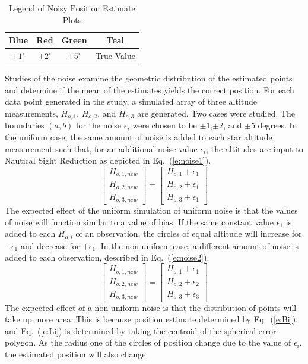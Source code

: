 \documentclass[12pt,a4paper]{book}
\begin{document}
\begin{table}[ht!]
\centering
\begin{tabular}{ |c|c|c|c| } 
 \hline
 Blue & Red & Green & Teal\\ 
 \hline
 $\pm 1^{\circ}$ & $\pm 2^{\circ}$& $\pm 5^{\circ}$ & True Value \\ 
 \hline
\end{tabular}
\caption{Legend of Noisy Position Estimate Plots}
\label{t:colorz2}
\end{table}
Studies of the noise examine the geometric distribution of the estimated points and determine if the mean of the estimates yields the correct position.  For each data point generated in the study, a simulated array of three altitude measurements, $H_{o,1}$, $H_{o,2}$, and $H_{o,3}$ are generated.  
Two cases were studied.  The boundaries $(a,b)$ for the noise $\epsilon_{i}$ were chosen to be $\pm 1$,$\pm 2$, and $\pm5 $ degrees. In the uniform case, the same amount of noise is added to each star altitude measurement such that, for an additional noise value $\epsilon_{i}$, the altitudes are input to Nautical Sight Reduction as depicted in Eq.~(\ref{e:noise1}).
\begin{equation}
\begin{bmatrix}
H_{o,1,new} \\
H_{o,2,new}\\
H_{o,3,new}
\end{bmatrix} = 
\begin{bmatrix}
H_{o,1} + \epsilon_{1}\\
H_{o,2} + \epsilon_{1}\\
H_{o,3} + \epsilon_{1}
\end{bmatrix}
\label{e:noise1}
\end{equation}
The expected effect of the uniform simulation of uniform noise is that the values of noise will function similar to a value of bias.  If the same constant value $\epsilon_{1}$ is added to each $H_{o,i}$ of an observation, the circles of equal altitude will increase for $-\epsilon_{1}$ and decrease for $+\epsilon_{1}$.
In the non-uniform case, a different amount of noise is added to each observation, described in Eq.~(\ref{e:noise2}).
\begin{equation}
\begin{bmatrix}
H_{o,1,new} \\
H_{o,2,new}\\
H_{o,3,new}
\end{bmatrix} = 
\begin{bmatrix}
H_{o,1} + \epsilon_{1}\\
H_{o,2} + \epsilon_{2}\\
H_{o,3} + \epsilon_{3}
\end{bmatrix}
\label{e:noise2}
\end{equation}
The expected effect of a non-uniform noise is that the distribution of points will take up more area.  This is because position estimate determined by Eq.~(\ref{e:Bi}), and Eq.~(\ref{e:Li}) is determined by taking the centroid of the spherical error polygon. As the radius one of the circles of position change due to the value of $\epsilon_{i}$, the estimated position will also change. 
\end{document}
